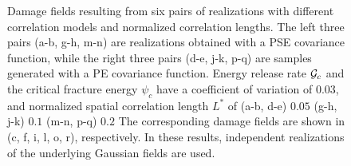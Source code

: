 \begin{figure}[!htbp]
\begin{subfigure}[b]{0.15\textwidth}
    \caption{}
    \label{fig: Chapter4/2D/d_exp_cartesian_20_20_rho_0_seed_b}
  \end{subfigure}
  \caption{Damage fields resulting from six pairs of realizations with different correlation models and normalized correlation lengths. The left three pairs (a-b, g-h, m-n) are realizations obtained with a PSE covariance function, while the right three pairs (d-e, j-k, p-q) are samples generated with a PE covariance function. Energy release rate ${\mathcal{G}_c}$ and the critical fracture energy $\psi_c$ have a coefficient of variation of $0.03$, and normalized spatial correlation length $L^*$ of (a-b, d-e) $0.05$ (g-h, j-k) $0.1$ (m-n, p-q) $0.2$ The corresponding damage fields are shown in (c, f, i, l, o, r), respectively. In these results, independent realizations of the underlying Gaussian fields are used.}
  \label{fig: Chapter4/2D/compare_correlation_length}
\end{figure}
